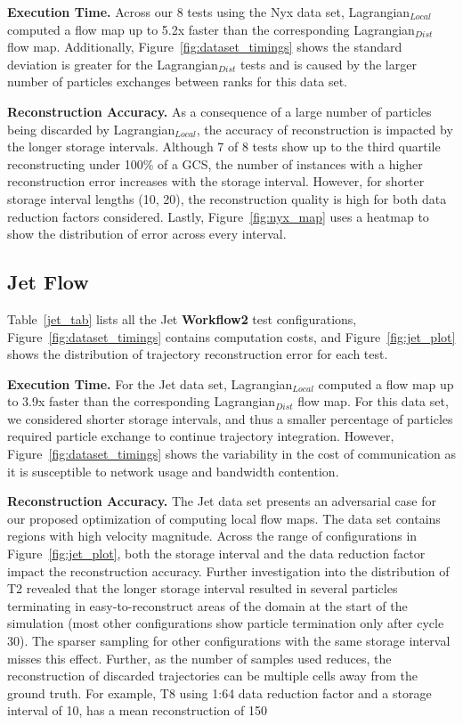 \textbf{Execution Time.} Across our 8 tests using the Nyx data set, Lagrangian$_{Local}$ computed a flow map up to 5.2x faster than the corresponding Lagrangian$_{Dist}$ flow map.
%
Additionally, Figure~\ref{fig:dataset_timings} shows the standard deviation is greater for the Lagrangian$_{Dist}$ tests and is caused by the larger number of particles exchanges between ranks for this data set.
%

\textbf{Reconstruction Accuracy.} As a consequence of a large number of particles being discarded by Lagrangian$_{Local}$, the accuracy of reconstruction is impacted by the longer storage intervals.
%
Although 7 of 8 tests show up to the third quartile reconstructing under 100\% of a GCS, the number of instances with a higher reconstruction error increases with the storage interval.
%
However, for shorter storage interval lengths (10, 20), the reconstruction quality is high for both data reduction factors considered. 
%
Lastly, Figure~\ref{fig:nyx_map} uses a heatmap to show the distribution of error across every interval. 




\subsection{Jet Flow}
\label{sec:jet}
Table~\ref{jet_tab} lists all the Jet \textbf{Workflow2} test configurations, Figure~\ref{fig:dataset_timings} contains computation costs, and Figure~\ref{fig:jet_plot} shows the distribution of trajectory reconstruction error for each test.
%


\textbf{Execution Time.} For the Jet data set, Lagrangian$_{Local}$ computed a flow map up to 3.9x faster than the corresponding Lagrangian$_{Dist}$ flow map.
%
For this data set, we considered shorter storage intervals, and thus a smaller percentage of particles required particle exchange to continue trajectory integration.
%
However, Figure~\ref{fig:dataset_timings} shows the variability in the cost of communication as it is susceptible to network usage and bandwidth contention.
%

\textbf{Reconstruction Accuracy.} The Jet data set presents an adversarial case for our proposed optimization of computing local flow maps.
%
The data set contains regions with high velocity magnitude.
%
Across the range of configurations in Figure~\ref{fig:jet_plot}, both the storage interval and the data reduction factor impact the reconstruction accuracy.
%
Further investigation into the distribution of T2 revealed that the longer storage interval resulted in several particles terminating in easy-to-reconstruct areas of the domain at the start of the simulation (most other configurations show particle termination only after cycle 30).
%
%
The sparser sampling for other configurations with the same storage interval misses this effect.
%
Further, as the number of samples used reduces, the reconstruction of discarded trajectories can be multiple cells away from the ground truth.
%
For example, T8 using 1:64 data reduction factor and a storage interval of 10, has a mean reconstruction of 150%



